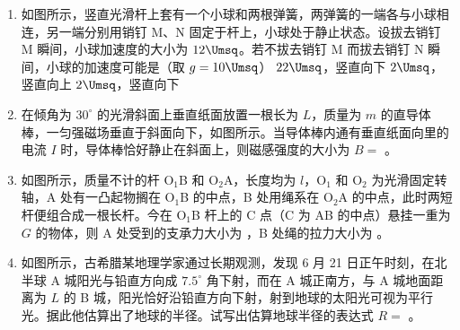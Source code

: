 \documentclass[\gkver]{gaokaozhenti}
\begin{document}
\begin{enumerate}
\item
如图所示，竖直光滑杆上套有一个小球和两根弹簧，两弹簧的一端各与小球相连，另一端分别用销钉 M、N 固定于杆上，小球处于静止状态。设拔去销钉 M 瞬间，小球加速度的大小为 $12\Umsq$。若不拔去销钉 M 而拔去销钉 N 瞬间，小球的加速度可能是（取 $g = 10\Umsq$）
\onepicture[h=4.5cm]{}
{$22\Umsq$，竖直向下}
{$2\Umsq$，竖直向上}
{$2\Umsq$，竖直向下}

\item
在倾角为 $30^{\circ}$ 的光滑斜面上垂直纸面放置一根长为 $L$，质量为 $m$ 的直导体棒，一匀强磁场垂直于斜面向下，如图所示。当导体棒内通有垂直纸面向里的电流 $I$ 时，导体棒恰好静止在斜面上，则磁感强度的大小为 $B =$ 。
\onepicture[h=4cm, align=right]{}

\item
如图所示，质量不计的杆 O$_{1}$B 和 O$_{2}$A，长度均为 $l$，O$_{1}$ 和 O$_{2}$ 为光滑固定转轴，A 处有一凸起物搁在 O$_{1}$B 的中点，B 处用绳系在 O$_{2}$A 的中点，此时两短杆便组合成一根长杆。今在 O$_{1}$B 杆上的 C 点（C 为 AB 的中点）悬挂一重为 $G$ 的物体，则 A 处受到的支承力大小为 ，B 处绳的拉力大小为 。
\onepicture[w=5cm, align=right]{}

\item
如图所示，古希腊某地理学家通过长期观测，发现 6 月 21 日正午时刻，在北半球 A 城阳光与铅直方向成 $7.5^{\circ}$ 角下射，而在 A 城正南方，与 A 城地面距离为 $L$ 的 B 城，阳光恰好沿铅直方向下射，射到地球的太阳光可视为平行光。据此他估算出了地球的半径。试写出估算地球半径的表达式 $R =$ 。
\onepicture[h=4.5cm, align=right]{}


\end{enumerate}
\end{document}

